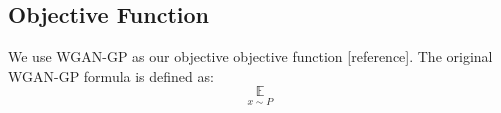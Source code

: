 \subsection{Objective Function}
We use WGAN-GP as our objective objective function [reference]. The original WGAN-GP formula is defined as:
\begin{equation}
\underset{x \sim P}{\mathbb{E}}
\end{equation}